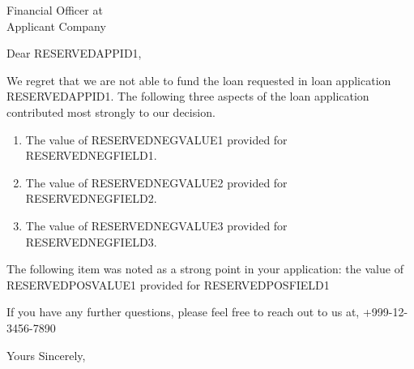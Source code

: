 \documentclass{letter}
\begin{document}
	
\address{%
	ACME Superior Lending Co. --TOTALLY FAKE\\
	12345 Common Road\\
    Somewhere on Earth 98765}
\signature{Jamie Doe\\
	Sr. Loan Officer \\
	Review Department\\
    ACME Superior Lending Co.}



\begin{letter}{Financial Officer at\\
	 Applicant Company}  %

\opening{Dear RESERVEDAPPID1,}

We regret that we are not able to fund the loan requested in loan application RESERVEDAPPID1.  The following three aspects of the loan application contributed most strongly to our decision.

\begin{enumerate}
	\item  The value of RESERVEDNEGVALUE1 provided for RESERVEDNEGFIELD1.
	\item  The value of RESERVEDNEGVALUE2 provided for RESERVEDNEGFIELD2.
	\item  The value of RESERVEDNEGVALUE3 provided for RESERVEDNEGFIELD3.
\end{enumerate}

The following item was noted as a strong point in your application:  the value of RESERVEDPOSVALUE1 provided for RESERVEDPOSFIELD1

If you have any further questions, please feel free to reach out to us at, +999-12-3456-7890

\closing{Yours Sincerely,}

\end{letter}
\end{document}
